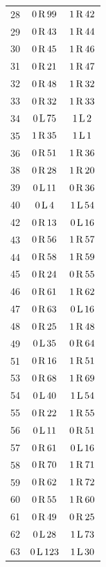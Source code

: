\begin{longtable}{@{}rcc@{}}
28 & $0\,\mathrm{R}\,99$ & $1\,\mathrm{R}\,42$\\
29 & $0\,\mathrm{R}\,43$ & $1\,\mathrm{R}\,44$\\
30 & $0\,\mathrm{R}\,45$ & $1\,\mathrm{R}\,46$\\
31 & $0\,\mathrm{R}\,21$ & $1\,\mathrm{R}\,47$\\
32 & $0\,\mathrm{R}\,48$ & $1\,\mathrm{R}\,32$\\
33 & $0\,\mathrm{R}\,32$ & $1\,\mathrm{R}\,33$\\
34 & $0\,\mathrm{L}\,75$ & $1\,\mathrm{L}\,2$\\
35 & $1\,\mathrm{R}\,35$ & $1\,\mathrm{L}\,1$\\
36 & $0\,\mathrm{R}\,51$ & $1\,\mathrm{R}\,36$\\
38 & $0\,\mathrm{R}\,28$ & $1\,\mathrm{R}\,20$\\
39 & $0\,\mathrm{L}\,11$ & $0\,\mathrm{R}\,36$\\
40 & $0\,\mathrm{L}\,4$ & $1\,\mathrm{L}\,54$\\
42 & $0\,\mathrm{R}\,13$ & $0\,\mathrm{L}\,16$\\
43 & $0\,\mathrm{R}\,56$ & $1\,\mathrm{R}\,57$\\
44 & $0\,\mathrm{R}\,58$ & $1\,\mathrm{R}\,59$\\
45 & $0\,\mathrm{R}\,24$ & $0\,\mathrm{R}\,55$\\
46 & $0\,\mathrm{R}\,61$ & $1\,\mathrm{R}\,62$\\
47 & $0\,\mathrm{R}\,63$ & $0\,\mathrm{L}\,16$\\
48 & $0\,\mathrm{R}\,25$ & $1\,\mathrm{R}\,48$\\
49 & $0\,\mathrm{L}\,35$ & $0\,\mathrm{R}\,64$\\
51 & $0\,\mathrm{R}\,16$ & $1\,\mathrm{R}\,51$\\
53 & $0\,\mathrm{R}\,68$ & $1\,\mathrm{R}\,69$\\
54 & $0\,\mathrm{L}\,40$ & $1\,\mathrm{L}\,54$\\
55 & $0\,\mathrm{R}\,22$ & $1\,\mathrm{R}\,55$\\
56 & $0\,\mathrm{L}\,11$ & $0\,\mathrm{R}\,51$\\
57 & $0\,\mathrm{R}\,61$ & $0\,\mathrm{L}\,16$\\
58 & $0\,\mathrm{R}\,70$ & $1\,\mathrm{R}\,71$\\
59 & $0\,\mathrm{R}\,62$ & $1\,\mathrm{R}\,72$\\
60 & $0\,\mathrm{R}\,55$ & $1\,\mathrm{R}\,60$\\
61 & $0\,\mathrm{R}\,49$ & $0\,\mathrm{R}\,25$\\
62 & $0\,\mathrm{L}\,28$ & $1\,\mathrm{L}\,73$\\
63 & $0\,\mathrm{L}\,123$ & $1\,\mathrm{L}\,30$\\

\end{longtable}
